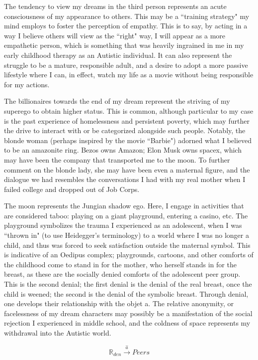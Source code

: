 \documentclass{article}
\begin{document}
The tendency to view my dreams in the third person represents an acute consciousness of my appearance to others. This may be a ``training strategy" my mind employs to foster the perception of empathy. This is to say, by acting in a way I believe others will view as the ``right" way, I will appear as a more empathetic person, which is something that was heavily ingrained in me in my early childhood therapy as an Autistic individual. It can also represent the struggle to be a mature, responsible adult, and a desire to adopt a more passive lifestyle where I can, in effect, watch my life as a movie without being responsible for my actions.

The billionaires towards the end of my dream represent the striving of my superego to obtain higher status. This is common, although particular to my case is the past experience of homelessness and persistent poverty, which may further the drive to interact with or be categorized alongside such people. Notably, the blonde woman (perhaps inspired by the movie ``Barbie") adorned what I believed to be an amazonite ring. Bezos owns Amazon; Elon Musk owns spacex, which may have been the company that transported me to the moon. To further comment on the blonde lady, she may have been even a maternal figure, and the dialogue we had resembles the conversations I had with my real mother when I failed college and dropped out of Job Corps.

The moon represents the Jungian shadow ego. Here, I engage in activities that are considered taboo: playing on a giant playground, entering a casino, etc. The playground symbolizes the trauma I experienced as an adolescent, when I was ``thrown in" (to use Heidegger's terminology) to a world where I was no longer a child, and thus was forced to seek satisfaction outside the maternal symbol. This is indicative of an Oedipus complex; playgrounds, cartoons, and other comforts of the childhood come to stand in for the mother, who herself stands in for the breast, as these are the socially denied comforts of the adolescent peer group. This is the second denial; the first denial is the denial of the real breast, once the child is weened; the second is the denial of the symbolic breast. Through denial, one develops their relationship with the objet a. The relative anonymity, or facelessness of my dream characters may possibly be a manifestation of the social rejection I experienced in middle school, and the coldness of space represents my withdrawal into the Autistic world.

\begin{equation}
	\mathbb{R}_{den} \xrightarrow{\hat{a}} Peers
\end{equation}
\end{document}
